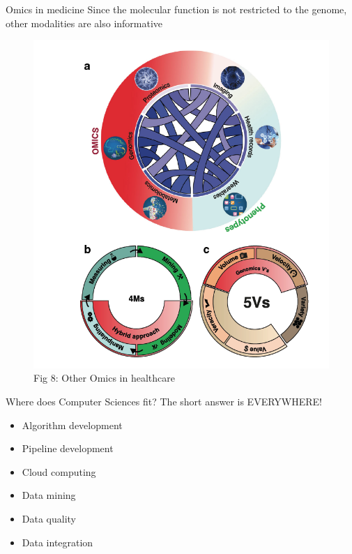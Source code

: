 \documentclass{beamer}
\begin{document}
	
	\begin{frame}{Omics in medicine}
		Since the molecular function is not restricted to the genome, other
		modalities are also informative
		\begin{figure}[h]
			\centering
			\includegraphics[scale=0.45]{Figures/other_omics.png}
			\caption{Fig 8: Other Omics in healthcare}
		\end{figure}	
		
	\end{frame}
	
	\begin{frame}{Where does Computer Sciences fit?}
		The short answer is EVERYWHERE!
		\begin{itemize}
			\item Algorithm development
			\item Pipeline development
			\item Cloud computing
			\item Data mining
			\item Data quality
			\item Data integration
		\end{itemize}
	\end{frame}
	
\end{document}

